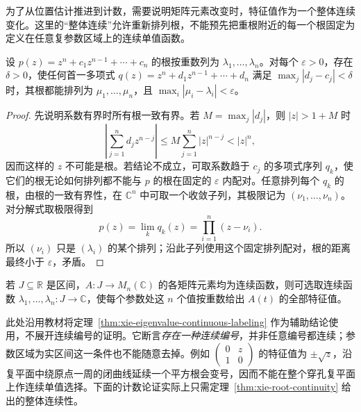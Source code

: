 为了从位置估计推进到计数，需要说明矩阵元素改变时，特征值作为一个整体连续变化。这里的“整体连续”允许重新排列根，不能预先把重根附近的每一个根固定为定义在任意复参数区域上的连续单值函数。

\begin{theorem}[多项式根的整体连续性]
\label{thm:xie-root-continuity}
设 $p(z)=z^n+c_1z^{n-1}+\cdots+c_n$ 的根按重数列为 $\lambda_1,\ldots,\lambda_n$。对每个 $\varepsilon>0$，存在 $\delta>0$，使任何首一多项式 $q(z)=z^n+d_1z^{n-1}+\cdots+d_n$ 满足 $\max_j|d_j-c_j|<\delta$ 时，其根都能排列为 $\mu_1,\ldots,\mu_n$，且 $\max_i|\mu_i-\lambda_i|<\varepsilon$。
\end{theorem}
\begin{proof}
先说明系数有界时所有根一致有界。若 $M=\max_j|d_j|$，则 $|z|>1+M$ 时
\[
 \left|\sum_{j=1}^n d_jz^{n-j}\right|
 \leq M\sum_{j=1}^n|z|^{n-j}<|z|^n,
\]
因而这样的 $z$ 不可能是根。若结论不成立，可取系数趋于 $c_j$ 的多项式序列 $q_k$，使它们的根无论如何排列都不能与 $p$ 的根在固定的 $\varepsilon$ 内配对。任意排列每个 $q_k$ 的根，由根的一致有界性，在 $\mathbb C^n$ 中可取一个收敛子列，其极限记为 $(\nu_1,\ldots,\nu_n)$。对分解式取极限得到
\[
 p(z)=\lim_k q_k(z)=\prod_{i=1}^n(z-\nu_i).
\]
所以 $(\nu_i)$ 只是 $(\lambda_i)$ 的某个排列；沿此子列使用这个固定排列配对，根的距离最终小于 $\varepsilon$，矛盾。
\end{proof}

\begin{theorem}[实区间参数下的连续编号]
\label{thm:xie-eigenvalue-continuous-labeling}
若 $J\subseteq\mathbb R$ 是区间，$A:J\to M_n(\mathbb C)$ 的各矩阵元素均为连续函数，则可选取连续函数 $\lambda_1,\ldots,\lambda_n:J\to\mathbb C$，使每个参数处这 $n$ 个值按重数给出 $A(t)$ 的全部特征值。
\end{theorem}

此处沿用教材将定理~\ref{thm:xie-eigenvalue-continuous-labeling} 作为辅助结论使用，不展开连续编号的证明。它断言\emph{存在一种连续编号}，并非任意编号都连续；参数区域为实区间这一条件也不能随意去掉。例如 $\begin{pmatrix}0&z\\1&0\end{pmatrix}$ 的特征值为 $\pm\sqrt z$，沿复平面中绕原点一周的闭曲线延续一个平方根会变号，因而不能在整个穿孔复平面上作连续单值选择。下面的计数论证实际上只需定理~\ref{thm:xie-root-continuity} 给出的整体连续性。

